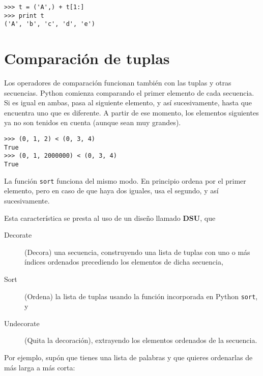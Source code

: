 \beforeverb
\begin{verbatim}
>>> t = ('A',) + t[1:]
>>> print t
('A', 'b', 'c', 'd', 'e')
\end{verbatim}
\afterverb
%

\section{Comparación de tuplas}


Los operadores de comparación funcionan también con las tuplas y otras secuencias.
Python comienza comparando el primer elemento de cada
secuencia. Si es igual en ambas, pasa al siguiente elemento,
y así sucesivamente, hasta que encuentra uno que es diferente. A partir de ese momento,
los elementos siguientes ya no son tenidos en cuenta (aunque sean muy grandes).


\beforeverb
\begin{verbatim}
>>> (0, 1, 2) < (0, 3, 4)
True
>>> (0, 1, 2000000) < (0, 3, 4)
True
\end{verbatim}
\afterverb
%
La función {\tt sort} funciona del mismo modo. En principio
ordena por el primer elemento, pero en caso de que haya dos iguales,
usa el segundo, y así sucesivamente. 

Esta característica se presta al uso de un diseño llamado {\bf DSU}, que

\begin{description}

\item[Decorate] (Decora) una secuencia, construyendo una lista de tuplas
con uno o más índices ordenados precediendo los elementos de dicha secuencia,

\item[Sort] (Ordena) la lista de tuplas usando la función incorporada en Python {\tt sort}, y

\item[Undecorate] (Quita la decoración), extrayendo los elementos ordenados de la secuencia.

\end{description}

\label{DSU}

Por ejemplo, supón que tienes una lista de palabras y que quieres
ordenarlas de más larga a más corta:

